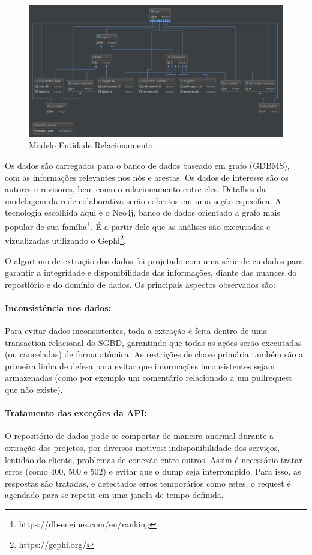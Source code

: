 \documentclass[sigconf]{acmart}
\begin{document}
\begin{figure}[!htbp]
 \includegraphics[width=\textwidth]{mer}
 \caption{Modelo Entidade Relacionamento}\label{fig:mer}
\end{figure}

Os dados são carregados para o banco de dados baseado em grafo (GDBMS), com as informações relevantes nos nós e arestas. Os dados de interesse são os autores e revisores, bem como o relacionamento entre eles. Detalhes da modelagem da rede colaborativa serão cobertos em uma seção específica. A tecnologia escolhida aqui é o Neo4j, banco de dados orientado a grafo mais popular de sua família\footnote{https://db-engines.com/en/ranking}. É a partir dele que as análises são executadas e vizualizadas utilizando o Gephi\footnote{https://gephi.org/}.

O algortimo de extração dos dados foi projetado com uma série de cuidados para garantir a integridade e disponibilidade das informações, diante das nuances do repostiório e do domínio de dados. Os principais aspectos observados são:

\paragraph{Inconsistência nos dados: } Para evitar dados inconsistentes, toda a extração é feita dentro de uma transaction relacional do SGBD, garantindo que todas as ações serão executadas (ou canceladas) de forma atômica. As restrições de chave primária também são a primeira linha de defesa para evitar que informações inconsistentes sejam armazenadas (como por exemplo um comentário relacionado a um pullrequest que não existe).

\paragraph{Tratamento das exceções da API: } O repositório de dados pode se comportar de maneira anormal durante a extração dos projetos, por diversos motivos: indisponibilidade dos serviços, lentidão do cliente, problemas de conexão entre outros. Assim é necessário tratar erros (como 400, 500 e 502) e evitar que o dump seja interrompido. Para isso, as respostas são tratadas, e detectados erros temporários como estes, o request é agendado para se repetir em uma janela de tempo definida.
\end{document}
